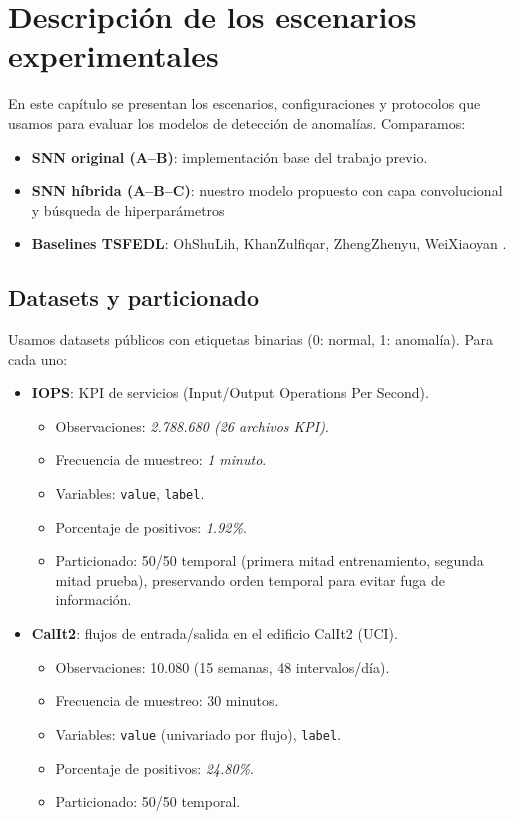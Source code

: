 \section{Descripción de los escenarios experimentales}

En este capítulo se presentan los escenarios, configuraciones y protocolos que usamos para evaluar los modelos de detección de anomalías. Comparamos:
\begin{itemize}
    \item \textbf{SNN original (A--B)}: implementación base del trabajo previo.
    \item \textbf{SNN híbrida (A--B--C)}: nuestro modelo propuesto con capa convolucional y búsqueda de hiperparámetros
    \item \textbf{Baselines TSFEDL}: OhShuLih, KhanZulfiqar, ZhengZhenyu, WeiXiaoyan .
\end{itemize}

\subsection{Datasets y particionado}
Usamos datasets públicos con etiquetas binarias (0: normal, 1: anomalía). Para cada uno:
\begin{itemize}
    \item \textbf{IOPS}: KPI de servicios (Input/Output Operations Per Second). 
    \begin{itemize}
        \item Observaciones: \textit{2.788.680 (26 archivos KPI)}.
        \item Frecuencia de muestreo: \textit{1 minuto}.
        \item Variables: \texttt{value}, \texttt{label}.
        \item Porcentaje de positivos: \textit{1.92\%}.
        \item Particionado: 50/50 temporal (primera mitad entrenamiento, segunda mitad prueba), preservando orden temporal para evitar fuga de información.
    \end{itemize}
    \item \textbf{CalIt2}: flujos de entrada/salida en el edificio CalIt2 (UCI).
    \begin{itemize}
        \item Observaciones: 10.080 (15 semanas, 48 intervalos/día).
        \item Frecuencia de muestreo: 30 minutos.
        \item Variables: \texttt{value} (univariado por flujo), \texttt{label}.
        \item Porcentaje de positivos: \textit{24.80\%}.
        \item Particionado: 50/50 temporal. 
    \end{itemize}
\end{itemize}

